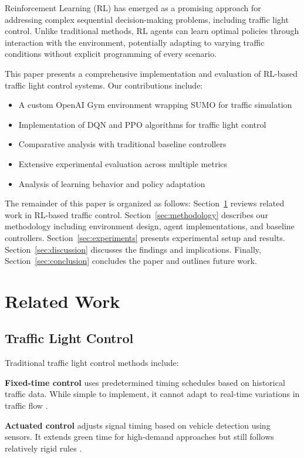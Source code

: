 \documentclass[conference]{IEEEtran}
\begin{document}
Reinforcement Learning (RL) has emerged as a promising approach for addressing complex sequential decision-making problems, including traffic light control. Unlike traditional methods, RL agents can learn optimal policies through interaction with the environment, potentially adapting to varying traffic conditions without explicit programming of every scenario.

This paper presents a comprehensive implementation and evaluation of RL-based traffic light control systems. Our contributions include:

\begin{itemize}
\item A custom OpenAI Gym environment wrapping SUMO for traffic simulation
\item Implementation of DQN and PPO algorithms for traffic light control
\item Comparative analysis with traditional baseline controllers
\item Extensive experimental evaluation across multiple metrics
\item Analysis of learning behavior and policy adaptation
\end{itemize}

The remainder of this paper is organized as follows: Section~\ref{sec:related_work} reviews related work in RL-based traffic control. Section~\ref{sec:methodology} describes our methodology including environment design, agent implementations, and baseline controllers. Section~\ref{sec:experiments} presents experimental setup and results. Section~\ref{sec:discussion} discusses the findings and implications. Finally, Section~\ref{sec:conclusion} concludes the paper and outlines future work.

\section{Related Work}
\label{sec:related_work}

\subsection{Traffic Light Control}
Traditional traffic light control methods include:

\textbf{Fixed-time control} uses predetermined timing schedules based on historical traffic data. While simple to implement, it cannot adapt to real-time variations in traffic flow \cite{roess2011traffic}.

\textbf{Actuated control} adjusts signal timing based on vehicle detection using sensors. It extends green time for high-demand approaches but still follows relatively rigid rules \cite{kell1982actuated}.
\end{document}
